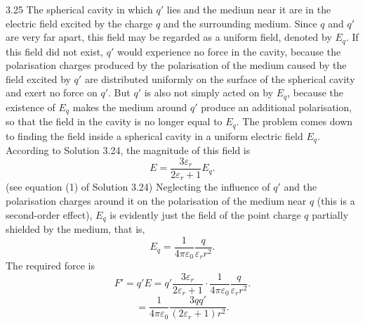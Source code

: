 \begin{solution}{3.25}
The spherical cavity in which $q'$ lies and the medium near it are in the electric field excited by the charge $q$ and the surrounding medium. Since $q$ and $q'$ are very far apart, this field may be regarded as a uniform field, denoted by $E_q$. If this field did not exist, $q'$ would experience no force in the cavity, because the polarisation charges produced by the polarisation of the medium caused by the field excited by $q'$ are distributed uniformly on the surface of the spherical cavity and exert no force on $q'$. But $q'$ is also not simply acted on by $E_q$, because the existence of $E_q$ makes the medium around $q'$ produce an additional polarisation, so that the field in the cavity is no longer equal to $E_q$. The problem comes down to finding the field inside a spherical cavity in a uniform electric field $E_q$. According to Solution 3.24, the magnitude of this field is
\[
E=\frac{3\varepsilon_r}{2\varepsilon_r+1}E_q.
\]
(see equation (1) of Solution 3.24) Neglecting the influence of $q'$ and the polarisation charges around it on the polarisation of the medium near $q$ (this is a second-order effect), $E_q$ is evidently just the field of the point charge $q$ partially shielded by the medium, that is,
\[
E_q=\frac{1}{4\pi\varepsilon_0}\frac{q}{\varepsilon_rr^2}.
\]
The required force is
\[
F'=q'E=q'\frac{3\varepsilon_r}{2\varepsilon_r+1}\cdot\frac{1}{4\pi\varepsilon_0}\frac{q}{\varepsilon_rr^2}.
\]
\[
=\frac{1}{4\pi\varepsilon_0}\frac{3qq'}{(2\varepsilon_r+1)r^2}.
\]
\end{solution}

